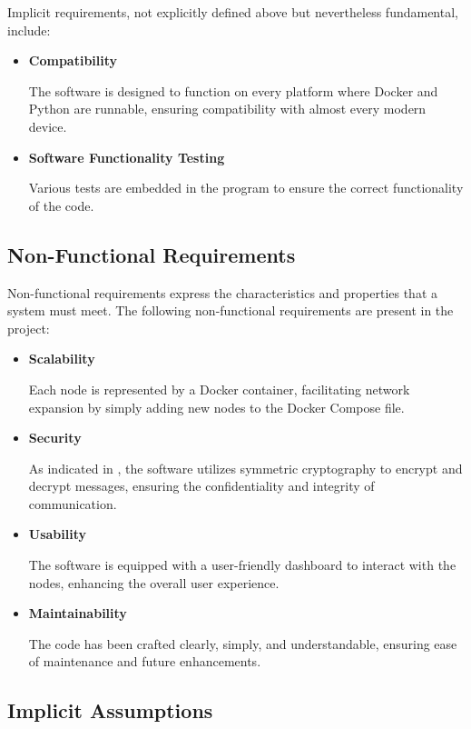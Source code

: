 \documentclass{scrartcl}
\begin{document}
Implicit requirements, not explicitly defined above but nevertheless fundamental, include:

\begin{itemize}
    \item \textbf{Compatibility}
    
    The software is designed to function on every platform where Docker and Python are runnable, ensuring compatibility with almost every modern device.
    \item \textbf{Software Functionality Testing}
    
    Various tests are embedded in the program to ensure the correct functionality of the code.
\end{itemize}

\subsection{Non-Functional Requirements}

Non-functional requirements express the characteristics and properties that a system must meet. The following non-functional requirements are present in the project:

\begin{itemize}
    \item \textbf{Scalability}
    
    Each node is represented by a Docker container, facilitating network expansion by simply adding new nodes to the Docker Compose file.
    \item \textbf{Security}
    
    As indicated in \cite{paper}, the software utilizes symmetric cryptography to encrypt and decrypt messages, ensuring the confidentiality and integrity of communication.
    \item \textbf{Usability}
    
    The software is equipped with a user-friendly dashboard to interact with the nodes, enhancing the overall user experience.
    \item \textbf{Maintainability}
    
    The code has been crafted clearly, simply, and understandable, ensuring ease of maintenance and future enhancements.
\end{itemize}


\subsection{Implicit Assumptions}
\end{document}
